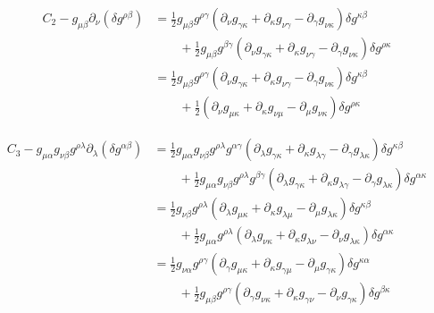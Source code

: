 \documentclass{article}
\theoremstyle{definition}
\begin{document}
\begin{align}
    C_2 - g_{\mu\beta} \partial_\nu (\delta g^{\rho\beta}) &= \frac{1}{2} g_{\mu\beta} g^{\rho \gamma} (\partial_\nu g_{\gamma \kappa} + \partial_\kappa g_{\nu \gamma} - \partial_\gamma g_{\nu\kappa}) \delta g^{\kappa\beta} 
    \nonumber \\
                                                               &\qquad + \frac{1}{2} g_{\mu\beta} g^{\beta\gamma} (\partial_\nu g_{\gamma \kappa} + \partial_\kappa g_{\nu \gamma} - \partial_\gamma g_{\nu\kappa} ) \delta g^{\rho \kappa}\\
                                                               &=\frac{1}{2} g_{\mu\beta} g^{\rho \gamma} (\partial_\nu g_{\gamma \kappa} + \partial_\kappa g_{\nu \gamma} - \partial_\gamma g_{\nu\kappa}) \delta g^{\kappa\beta} 
    \nonumber \\
                                                               &\qquad + \frac{1}{2}  (\partial_\nu g_{\mu \kappa} + \partial_\kappa g_{\nu \mu} - \partial_\mu g_{\nu\kappa} ) \delta g^{\rho \kappa}
\end{align}

\begin{align}
    C_3 - g_{\mu\alpha} g_{\nu\beta} g^{\rho\lambda} \partial_\lambda (\delta g^{\alpha\beta} )
    &= \frac{1}{2} g_{\mu\alpha} g_{\nu\beta} g^{\rho\lambda} g^{\alpha \gamma} (\partial_\lambda g_{\gamma \kappa} + \partial_\kappa g_{\lambda \gamma} - \partial_\gamma g_{\lambda \kappa} ) \delta g^{\kappa\beta} \nonumber \\
    &\qquad + \frac{1}{2} g_{\mu\alpha} g_{\nu\beta} g^{\rho\lambda} g^{\beta \gamma} (\partial_\lambda g_{\gamma \kappa} + \partial_\kappa g_{\lambda \gamma} - \partial_\gamma g_{\lambda \kappa} ) \delta g^{\alpha\kappa}  \\
    &= \frac{1}{2}  g_{\nu\beta} g^{\rho\lambda}  (\partial_\lambda g_{\mu \kappa} + \partial_\kappa g_{\lambda \mu} - \partial_\mu g_{\lambda \kappa} ) \delta g^{\kappa\beta} \nonumber \\
    &\qquad + \frac{1}{2} g_{\mu\alpha} g^{\rho\lambda}  (\partial_\lambda g_{\nu \kappa} + \partial_\kappa g_{\lambda \nu} - \partial_\nu g_{\lambda \kappa} ) \delta g^{\alpha\kappa}  \\
    &= \frac{1}{2}  g_{\nu\alpha} g^{\rho\gamma}  (\partial_\gamma g_{\mu \kappa} + \partial_\kappa g_{\gamma \mu} - \partial_\mu g_{\gamma \kappa} ) \delta g^{\kappa \alpha} \nonumber \\
    &\qquad + \frac{1}{2} g_{\mu\beta} g^{\rho \gamma }  (\partial_\gamma g_{\nu \kappa} + \partial_\kappa g_{ \gamma \nu} - \partial_\nu g_{\gamma \kappa} ) \delta g^{\beta\kappa}  
\end{align}
\end{document}
